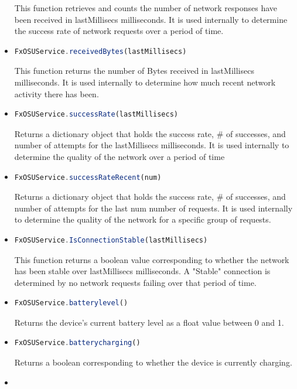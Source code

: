 \documentclass[12pt]{article}
\begin{document}
\begin{itemize}
    This function retrieves and counts the number of network responses have been received in lastMillisecs milliseconds.  It is used internally to determine the success rate of network requests over a period of time.
  \item \begin{lstlisting}[language=JavaScript]
FxOSUService.receivedBytes(lastMillisecs)
    \end{lstlisting}
    This function returns the number of Bytes received in lastMillisecs milliseconds.  It is used internally to determine how much recent network activity there has been.  
  \item \begin{lstlisting}[language=JavaScript]
FxOSUService.successRate(lastMillisecs)
    \end{lstlisting}
    Returns a dictionary object that holds the success rate, \# of successes, and number of attempts for the lastMillisecs milliseconds.  It is used internally to determine the quality of the network over a period of time
  \item \begin{lstlisting}[language=JavaScript]
FxOSUService.successRateRecent(num)
    \end{lstlisting}
    Returns a dictionary object that holds the success rate, \# of successes, and number of attempts for the last num number of requests. It is used internally to determine the quality of the network for a specific group of requests.
  \item \begin{lstlisting}[language=JavaScript]
FxOSUService.IsConnectionStable(lastMillisecs)
    \end{lstlisting}
    This function returns a boolean value corresponding to whether the network has been stable over lastMillisecs milliseconds. A "Stable" connection is determined by no network requests failing over that period of time.  
  \item \begin{lstlisting}[language=JavaScript]
FxOSUService.batterylevel()
    \end{lstlisting}
    Returns the device's current battery level as a float value between 0 and 1.  
  \item \begin{lstlisting}[language=JavaScript]
FxOSUService.batterycharging()
    \end{lstlisting}
    Returns a boolean corresponding to whether the device is currently charging.  
  \item \begin{lstlisting}[language=JavaScript]

\end{lstlisting}
\end{itemize}
\end{document}
